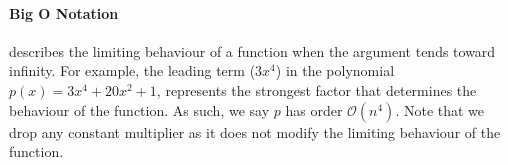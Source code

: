 \paragraph{Big O Notation} describes the limiting behaviour of a function when the argument tends toward infinity.
\label{supp::big_o}
For example, the leading term ($3 x^4$) in the polynomial $p(x) = 3 x^4 + 20 x^2 + 1$, represents the strongest factor that determines the behaviour of the function. As such, we say $p$ has order $\mathcal{O}(n^4)$. Note that we drop any constant multiplier as it does not modify the limiting behaviour of the function.